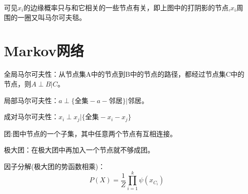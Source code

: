 \documentclass[UTF8]{ctexart} %
\begin{document}
			可见$x_i$的边缘概率只与和它相关的一些节点有关，即上图中的打阴影的节点,$x_i$周围的一圈又叫马尔可夫毯。
			
			
	\section{Markov网络}	
		全局马尔可夫性：从节点集A中的节点到B中的节点的路径，都经过节点集C中的节点，则$A\perp B|C$。
		
		局部马尔可夫性：$a\perp \{\text{全集}-a-\text{邻居}\}|\text{邻居}$。
		
		成对马尔可夫性：$x_i\perp x_j|\{\text{全集}-x_i-x_j\}$ 
		
		团:图中节点的一个子集，其中任意两个节点有互相连接。
		
		极大团：在极大团中再加入一个节点就不够成团。
		
		因子分解(极大团的势函数相乘)：
		\[P(X) = \frac{1}{Z}\prod_{i=1}^k \psi(x_{C_i})\]
		
		
		

			

		
			
			
\end{document}
